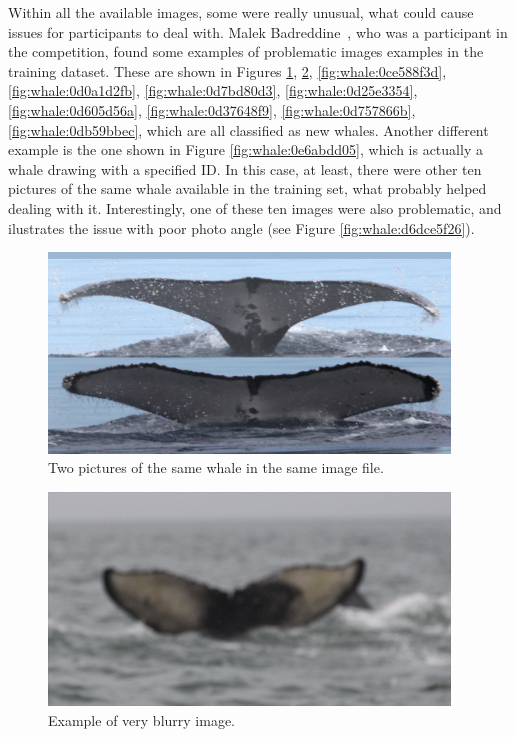 \documentclass[12pt,
    brazil,			%
	english,        %
	]{article}
\begin{document}
Within all the available images, some were really unusual, what could cause issues for participants to deal with. Malek Badreddine~\cite{badreddine2019bad}, who was a participant in the competition, found some examples of problematic images examples in the training dataset. These are shown in Figures \ref{fig:whale:0a5216ef5}, \ref{fig:whale:0c0bf8fb8}, \ref{fig:whale:0ce588f3d}, \ref{fig:whale:0d0a1d2fb}, \ref{fig:whale:0d7bd80d3}, \ref{fig:whale:0d25e3354}, \ref{fig:whale:0d605d56a}, \ref{fig:whale:0d37648f9}, \ref{fig:whale:0d757866b}, \ref{fig:whale:0db59bbec}, which are all classified as new whales. Another different example is the one shown in Figure \ref{fig:whale:0e6abdd05}, which is actually a whale drawing with a specified ID. In this case, at least, there were other ten pictures of the same whale available in the training set, what probably helped dealing with it. Interestingly, one of these ten images were also problematic, and ilustrates the issue with poor photo angle (see Figure \ref{fig:whale:d6dce5f26}). %

\begin{figure}
    \centering
    \includegraphics[width=0.95\textwidth]{images/whales/0a5216ef5.jpg}
    \caption{Two pictures of the same whale in the same image file.}
    \label{fig:whale:0a5216ef5}
\end{figure}

\begin{figure}
    \centering
    \includegraphics[width=0.95\textwidth]{images/whales/0c0bf8fb8.jpg}
    \caption{Example of very blurry image.}
    \label{fig:whale:0c0bf8fb8}
\end{figure}
\end{document}
